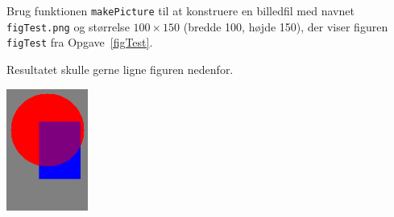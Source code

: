 Brug funktionen \lstinline{makePicture} til at konstruere en billedfil med navnet
\lstinline{figTest.png} og størrelse $100\times150$ (bredde 100, højde 150),
der viser figuren \lstinline{figTest} fra Opgave~\ref{figTest}.

Resultatet skulle gerne ligne figuren nedenfor.
\begin{center}
  \includegraphics[width=0.2\textwidth]{figTest.png}
\end{center}
